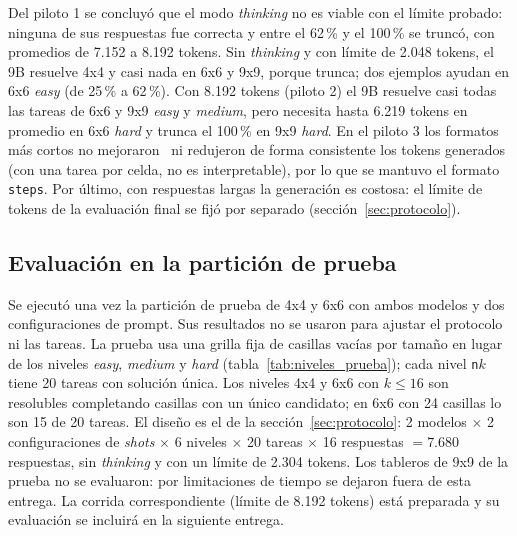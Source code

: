 Del piloto 1 se concluyó que el modo \emph{thinking} no es viable con el límite
probado: ninguna de sus respuestas fue correcta y entre el 62\,\% y el 100\,\% se
truncó, con promedios de 7.152 a 8.192 tokens. Sin \emph{thinking} y con límite
de 2.048 tokens, el 9B resuelve 4x4 y casi nada en 6x6 y 9x9, porque trunca;
dos ejemplos ayudan en 6x6 \emph{easy} (de 25\,\% a 62\,\%). Con 8.192 tokens
(piloto 2) el 9B resuelve casi todas las tareas de 6x6 y 9x9 \emph{easy} y
\emph{medium}, pero necesita hasta 6.219 tokens en promedio en 6x6 \emph{hard} y
trunca el 100\,\% en 9x9 \emph{hard}. En el piloto 3 los formatos más cortos no
mejoraron \passuno\ ni redujeron de forma consistente los tokens generados
(con una tarea por celda, no es interpretable), por lo que se mantuvo el formato
\texttt{steps}. Por
último, con respuestas largas la generación es costosa: el límite de tokens de la
evaluación final se fijó por separado (sección~\ref{sec:protocolo}).

\subsection{Evaluación en la partición de prueba}
\label{sec:prueba}
Se ejecutó una vez la partición de prueba de 4x4 y 6x6 con ambos modelos y dos
configuraciones de prompt. Sus resultados no se usaron para ajustar el
protocolo ni las tareas. La prueba usa una grilla fija de casillas vacías por
tamaño en lugar de los niveles \emph{easy}, \emph{medium} y \emph{hard}
(tabla~\ref{tab:niveles_prueba}); cada nivel \texttt{n$k$} tiene 20 tareas con
solución única. Los niveles 4x4 y 6x6 con $k \le 16$ son resolubles completando
casillas con un único candidato; en 6x6 con 24 casillas lo son 15 de 20 tareas.
El diseño es el de la sección~\ref{sec:protocolo}: 2 modelos $\times$ 2
configuraciones de \emph{shots} $\times$ 6 niveles $\times$ 20 tareas $\times$ 16
respuestas $= 7.680$ respuestas, sin \emph{thinking} y con un límite de 2.304
tokens. Los tableros de 9x9 de la prueba no se evaluaron: por limitaciones de tiempo se
dejaron fuera de esta entrega. La corrida correspondiente (límite de 8.192
tokens) está preparada y su evaluación se incluirá en la siguiente entrega.

